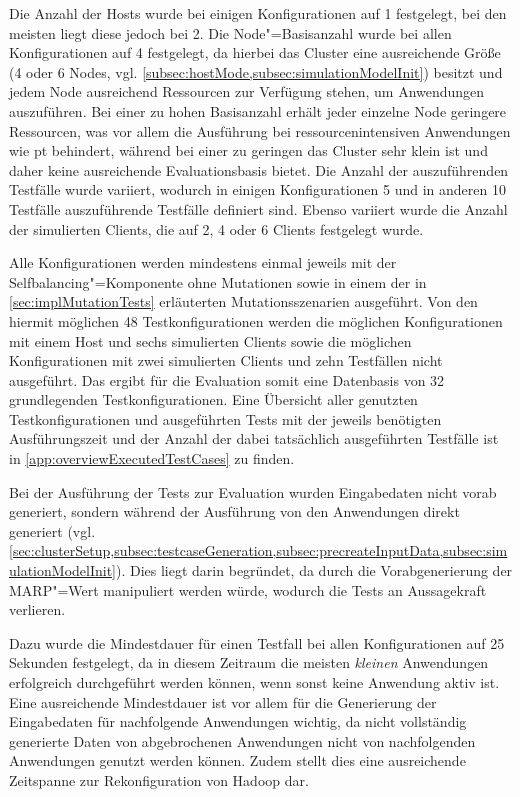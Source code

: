 Die Anzahl der Hosts wurde bei einigen Konfigurationen auf 1 festgelegt, bei den meisten liegt diese jedoch bei 2.
Die Node"=Basisanzahl wurde bei allen Konfigurationen auf 4 festgelegt, da hierbei das Cluster eine ausreichende Größe (4 oder 6 Nodes, vgl. \cref{subsec:hostMode,subsec:simulationModelInit}) besitzt und jedem Node ausreichend Ressourcen zur Verfügung stehen, um Anwendungen auszuführen.
Bei einer zu hohen Basisanzahl erhält jeder einzelne Node geringere Ressourcen, was vor allem die Ausführung bei ressourcenintensiven Anwendungen wie \zB \acrlong{pt} behindert, während bei einer zu geringen das Cluster sehr klein ist und daher keine ausreichende Evaluationsbasis bietet.
Die Anzahl der auszuführenden Testfälle wurde variiert, wodurch in einigen Konfigurationen 5 und in anderen 10 Testfälle auszuführende Testfälle definiert sind.
Ebenso variiert wurde die Anzahl der simulierten Clients, die auf 2, 4 oder 6 Clients festgelegt wurde.

Alle Konfigurationen werden mindestens einmal jeweils mit der Selfbalancing"=Komponente ohne Mutationen sowie in einem der in \cref{sec:implMutationTests} erläuterten Mutationsszenarien ausgeführt.
Von den hiermit möglichen 48 Testkonfigurationen werden die möglichen Konfigurationen mit einem Host und sechs simulierten Clients sowie die möglichen Konfigurationen mit zwei simulierten Clients und zehn Testfällen nicht ausgeführt.
Das ergibt für die Evaluation somit eine Datenbasis von 32 grundlegenden Testkonfigurationen.
Eine Übersicht aller genutzten Testkonfigurationen und ausgeführten Tests mit der jeweils benötigten Ausführungszeit und der Anzahl der dabei tatsächlich ausgeführten Testfälle ist in \cref{app:overviewExecutedTestCases} zu finden.

Bei der Ausführung der Tests zur Evaluation wurden Eingabedaten nicht vorab generiert, sondern während der Ausführung von den Anwendungen direkt generiert (vgl. \cref{sec:clusterSetup,subsec:testcaseGeneration,subsec:precreateInputData,subsec:simulationModelInit}).
Dies liegt darin begründet, da durch die Vorabgenerierung der \gls{MARP}"=Wert manipuliert werden würde, wodurch die Tests an Aussagekraft verlieren.

Dazu wurde die Mindestdauer für einen Testfall bei allen Konfigurationen auf 25 Sekunden festgelegt, da in diesem Zeitraum die meisten \emph{kleinen} Anwendungen erfolgreich durchgeführt werden können, wenn sonst keine Anwendung aktiv ist.
Eine ausreichende Mindestdauer ist vor allem für die Generierung der Eingabedaten für nachfolgende Anwendungen wichtig, da nicht vollständig generierte Daten von abgebrochenen Anwendungen nicht von nachfolgenden Anwendungen genutzt werden können.
Zudem stellt dies eine ausreichende Zeitspanne zur Rekonfiguration von Hadoop dar.

